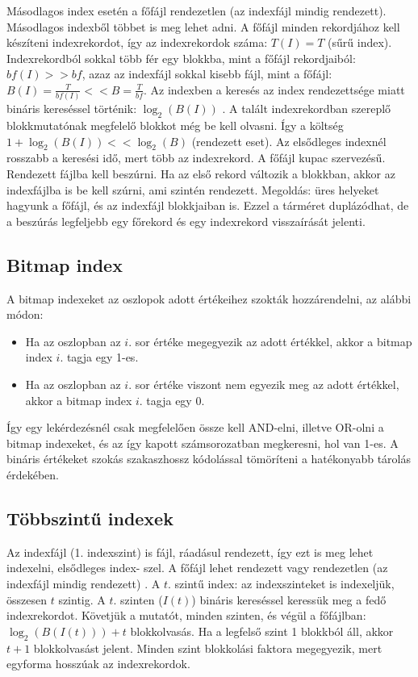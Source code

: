 \documentclass[margin=0px]{article}
\begin{document}
	Másodlagos index esetén a főfájl rendezetlen (az indexfájl mindig rendezett). Másodlagos indexből 
	többet is meg lehet adni. A főfájl minden rekordjához kell készíteni indexrekordot, így az 
	indexrekordok száma: $T(I) = T$ (sűrű index). Indexrekordból sokkal több fér egy blokkba, mint a főfájl 
	rekordjaiból: $bf(I) >> bf$, azaz az indexfájl sokkal kisebb fájl, mint a főfájl: $B(I) = \frac{T}{bf(I)} << 
	B=\frac{T}{bf}$.
	Az indexben a keresés az index rendezettsége miatt bináris kereséssel történik: $\log_{2}(B(I))$ . A talált 
	indexrekordban szereplő blokkmutatónak megfelelő blokkot még be kell olvasni. Így a költség
	$1+\log_{2}(B(I)) << \log_{2}(B)$ (rendezett eset). Az elsődleges indexnél rosszabb a keresési idő, mert több az 
	indexrekord.
	A főfájl kupac szervezésű. Rendezett fájlba kell beszúrni. Ha az első rekord változik a blokkban, akkor 
	az indexfájlba is be kell szúrni, ami szintén rendezett. Megoldás: üres helyeket hagyunk a főfájl, és az 
	indexfájl blokkjaiban is. Ezzel a tárméret duplázódhat, de a beszúrás legfeljebb egy főrekord és egy 
	indexrekord visszaírását jelenti.
	
	\subsection{Bitmap index}
	
	A bitmap indexeket az oszlopok adott értékeihez szokták hozzárendelni, az alábbi módon:
	\begin{itemize}
		\item	Ha az oszlopban az $i$. sor értéke megegyezik az adott értékkel, akkor a bitmap index $i$. tagja 
		egy 1-es.	
		
		\item	Ha az oszlopban az $i$. sor értéke viszont nem egyezik meg az adott értékkel, akkor a bitmap 
		index $i$. tagja egy 0.
	\end{itemize}

	Így egy lekérdezésnél csak megfelelően össze kell AND-elni, illetve OR-olni a bitmap indexeket, és az 
	így kapott számsorozatban megkeresni, hol van 1-es.
	A bináris értékeket szokás szakaszhossz kódolással tömöríteni a hatékonyabb tárolás érdekében.
		
	\subsection{Többszintű indexek}
	
	Az indexfájl (1. indexszint) is fájl, ráadásul rendezett, így ezt is meg lehet indexelni, elsődleges index-
	szel. A főfájl lehet rendezett vagy rendezetlen (az indexfájl mindig rendezett) . A $t$. szintű index: az 
	indexszinteket is indexeljük, összesen $t$ szintig.
	A $t$. szinten ($I(t)$)  bináris kereséssel keressük meg a fedő indexrekordot. Követjük a mutatót, minden 
	szinten, és végül a főfájlban: $\log_{2}(B(I(t))) + t$ blokkolvasás. Ha a legfelső szint 1 blokkból áll, akkor $t+1$
	blokkolvasást jelent. Minden szint blokkolási faktora megegyezik, mert egyforma hosszúak az 
	indexrekordok.
	
\end{document}
